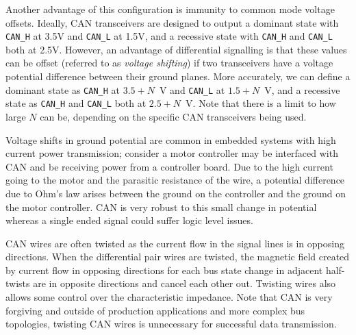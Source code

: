 \documentclass[main.tex]{subfiles}
\begin{document}
\noindent Another advantage of this configuration is immunity to common mode voltage offsets. Ideally, CAN transceivers are designed to output a dominant state with \texttt{CAN\_H} at 3.5V and \texttt{CAN\_L} at 1.5V, and a recessive state with \texttt{CAN\_H} and \texttt{CAN\_L} both at 2.5V. However, an advantage of differential signalling is that these values can be offset (referred to as \textit{voltage shifting}) if two transceivers have a voltage potential difference between their ground planes. More accurately, we can define a dominant state as \texttt{CAN\_H} at \(3.5 + N\)~V and \texttt{CAN\_L} at \(1.5 + N\)~V, and a recessive state as \texttt{CAN\_H} and \texttt{CAN\_L} both at \(2.5 + N\)~V. Note that there is a limit to how large \(N\) can be, depending on the specific CAN transceivers being used.

\noindent Voltage shifts in ground potential are common in embedded systems with high current power transmission; consider a motor controller may be interfaced with CAN and be receiving power from a controller board. Due to the high current going to the motor and the parasitic resistance of the wire, a potential difference due to Ohm's law arises between the ground on the controller and the ground on the motor controller. CAN is very robust to this small change in potential whereas a single ended signal could suffer logic level issues. \newline

\noindent CAN wires are often twisted as the current flow in the signal lines is in opposing directions. When the differential pair wires are twisted, the magnetic field created by current flow in opposing directions for each bus state change in adjacent half-twists are in opposite directions and cancel each other out. Twisting wires also allows some control over the characteristic impedance. Note that CAN is very forgiving and outside of production applications and more complex bus topologies, twisting CAN wires is unnecessary for successful data transmission. 
\end{document}
